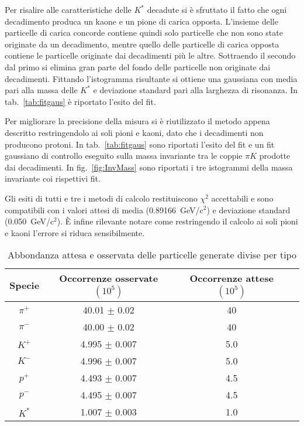 \documentclass[a4paper,10pt]{article}
\begin{document}
Per risalire alle caratteristiche delle $K^*$ decadute si è sfruttato il fatto che ogni decadimento produca un kaone e un pione di carica opposta. L'insieme delle particelle di carica concorde contiene quindi solo particelle che non sono state originate da un decadimento, mentre quello delle particelle di carica opposta contiene le particelle originate dai decadimenti più le altre. Sottraendo il secondo dal primo si elimina gran parte del fondo delle particelle non originate dai decadimenti. Fittando l'istogramma risultante si ottiene una gaussiana con media pari alla massa delle $K^*$ e deviazione standard pari alla larghezza di risonanza. In tab.~\ref{tab:fitgaus} è riportato l'esito del fit.

Per migliorare la precisione della misura si è riutilizzato il metodo appena descritto restringendolo ai soli pioni e kaoni, dato che i decadimenti non producono protoni. In tab.~\ref*{tab:fitgaus} sono riportati l'esito del fit e un fit gaussiano di controllo eseguito sulla massa invariante tra le coppie $\pi K$ prodotte dai decadimenti. In fig.~\ref*{fig:InvMass} sono riportati i tre istogrammi della massa invariante coi rispettivi fit.

Gli esiti di tutti e tre i metodi di calcolo restituiscono $\chi^2$ accettabili e sono compatibili con i valori attesi di media (0.89166~GeV/c$^2$) e deviazione standard (0.050~GeV/c$^2$).
È infine rilevante notare come restringendo il calcolo ai soli pioni e kaoni l'errore si riduca sensibilmente.

\begin{table}
  \caption{Abbondanza attesa e osservata delle particelle generate divise per tipo}
  \label{tab:abbondanza}
  \centering
  \begin{tabular}{cccc}
    \toprule
    Specie  & Occorrenze osservate $(10^5)$ & Occorrenze attese $(10^5)$ \\
    \midrule
    $\pi^+$ & 40.01 $\pm$ 0.02              & 40                         \\
    $\pi^-$ & 40.00 $\pm$ 0.02              & 40                         \\
    $K^+$   & 4.995 $\pm$ 0.007             & 5.0                        \\
    $K^-$   & 4.996 $\pm$ 0.007             & 5.0                        \\
    $p^+$   & 4.493 $\pm$ 0.007             & 4.5                        \\
    $p^-$   & 4.495 $\pm$ 0.007             & 4.5                        \\
    $K^*$   & 1.007 $\pm$ 0.003             & 1.0                        \\
    \bottomrule
  \end{tabular}
\end{table}
\end{document}
